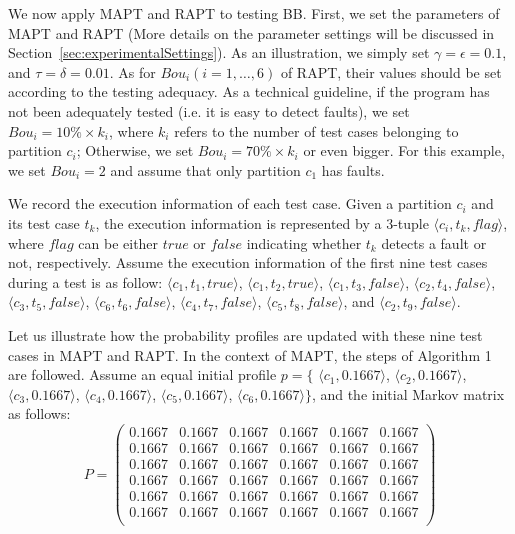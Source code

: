 \documentclass[10pt,journal,compsoc]{IEEEtran}
\begin{document}
We now apply MAPT and RAPT to testing BB. First, we set the parameters of MAPT and RAPT (More details on the parameter settings will be discussed in Section~\ref{sec:experimentalSettings}). As an illustration, we simply set $\gamma = \epsilon = 0.1$, and $\tau = \delta = 0.01$. As for $Bou_i (i = 1,\ldots,6)$ of RAPT, their values should be set according to the testing adequacy. As a technical guideline, if the program has not been adequately tested (i.e. it is easy to detect faults), we set $Bou_i = 10\%\times k_i$, where $k_i$ refers to the number of test cases belonging to partition $c_i$; Otherwise, we set $Bou_i = 70\%\times k_i$ or even bigger. For this example, we set $Bou_i = 2$ and assume that only partition $c_1$ has faults.

We record the execution information of each test case. Given a partition $c_i$ and its test case $t_k$, the execution information is represented by a 3-tuple $\langle c_i, t_k, flag \rangle$, where $flag$ can be either $true$ or $false$ indicating whether $t_k$ detects a fault or not, respectively. Assume the execution information of the first nine test cases during a test is as follow: $\langle c_1, t_1, true \rangle$, $\langle c_1, t_2, true \rangle$, $\langle c_1, t_3, false\rangle$, $\langle c_2, t_4, false \rangle$, $\langle c_3, t_5, false \rangle$, $\langle c_6, t_6, false \rangle$, $\langle c_4, t_7, false \rangle$, $\langle c_5, t_8, false \rangle$, and $\langle c_2, t_9, false \rangle$.

Let us illustrate how the probability profiles are updated with these nine test cases  in MAPT and RAPT. In the context of MAPT, the steps of Algorithm 1 are followed. Assume an equal initial profile $p = \{$ $\langle c_1, 0.1667 \rangle$, $\langle c_2, 0.1667\rangle$, $\langle c_3, 0.1667 \rangle$, $\langle c_4, 0.1667 \rangle$, $\langle c_5, 0.1667 \rangle$, $\langle c_6, 0.1667 \rangle\}$, and the initial Markov matrix as follows:
\begin{equation}
\label{eq:Inimatrix}
P =
\begin{pmatrix}
	0.1667 & 0.1667  & 0.1667  & 0.1667  & 0.1667  & 0.1667 \\
	0.1667 & 0.1667  & 0.1667  & 0.1667  & 0.1667  & 0.1667 \\
	0.1667 & 0.1667  & 0.1667  & 0.1667  & 0.1667  & 0.1667 \\
    0.1667 & 0.1667  & 0.1667  & 0.1667  & 0.1667  & 0.1667 \\
    0.1667 & 0.1667  & 0.1667  & 0.1667  & 0.1667  & 0.1667 \\
    0.1667 & 0.1667  & 0.1667  & 0.1667  & 0.1667  & 0.1667 \\
\end{pmatrix}
\end{equation}
\end{document}
